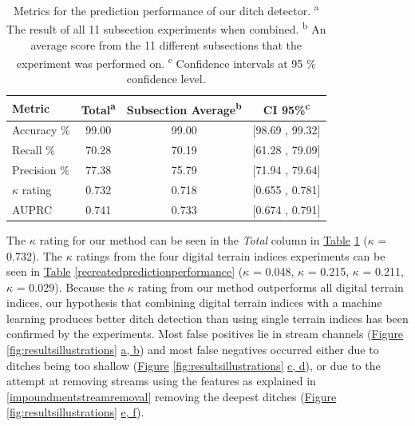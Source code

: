 \documentclass[11pt, review]{elsarticle} %
\begin{document}
\begin{table}[H]
\centering
    {\begin{tabular}{l|ccc}
        \textbf{Metric} & \textbf{Total}\textsuperscript{a} & \textbf{Subsection Average}\textsuperscript{b}& \textbf{CI 95\%}\textsuperscript{c} \\ 
        \hline
        Accuracy     \% & 99.00 & 99.00 & [98.69 , 99.32] \\
        Recall       \% & 70.28 & 70.19 & [61.28 , 79.09] \\
        Precision    \% & 77.38 & 75.79 & [71.94 , 79.64] \\
        $\kappa$ rating & 0.732 & 0.718 & [0.655 , 0.781] \\
        AUPRC           & 0.741 & 0.733 & [0.674 , 0.791] \\
        \hline
    \end{tabular}}
    \caption{Metrics for the prediction performance of our ditch detector. \newline
    \textsuperscript{a} The result of all 11 subsection experiments when combined. \newline
    \textsuperscript{b} An average score from the 11 different subsections that the experiment was performed on. \newline
    \textsuperscript{c} Confidence intervals at 95 \% confidence level.}
    \label{predictionperformance}
\end{table}

The $\kappa$ rating for our method can be seen in the \textit{Total} column in \hyperref[predictionperformance]{Table} \ref{predictionperformance} ($\kappa$ = 0.732). The $\kappa$ ratings from the four digital terrain indices experiments can be seen in  \hyperref[recreatedpredictionperformance]{Table} \ref{recreatedpredictionperformance} ($\kappa$ = 0.048, $\kappa$ = 0.215, $\kappa$ = 0.211, $\kappa$ = 0.029). Because the $\kappa$ rating from our method outperforms all digital terrain indices, our hypothesis that combining digital terrain indices with a machine learning produces better ditch detection than using single terrain indices has been confirmed by the experiments. Most false positives lie in stream channels (\hyperref[fig:resultsillustrations]{Figure} \ref{fig:resultsillustrations} \hyperref[fig:resultsillustrations]{a, b}) and most false negatives occurred either due to ditches being too shallow (\hyperref[fig:resultsillustrations]{Figure} \ref{fig:resultsillustrations} \hyperref[fig:resultsillustrations]{c, d}), or due to the attempt at removing streams using the features as explained in \ref{impoundmentstreamremoval} removing the deepest ditches  (\hyperref[fig:resultsillustrations]{Figure} \ref{fig:resultsillustrations} \hyperref[fig:resultsillustrations]{e, f}).
\end{document}
